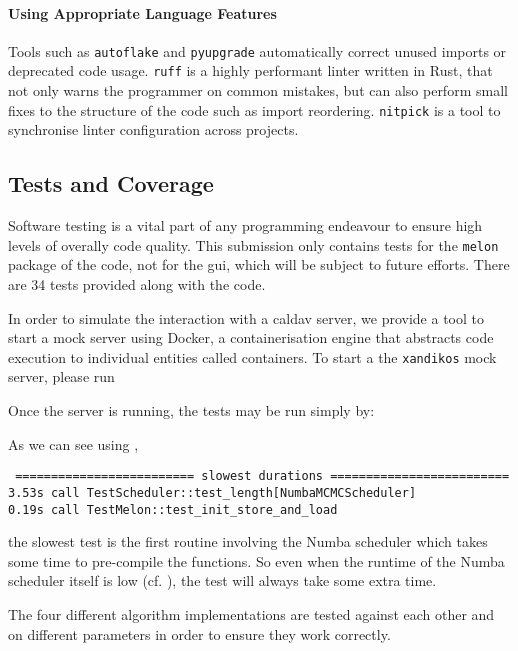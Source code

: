 \paragraph{Using Appropriate Language Features}
Tools such as \texttt{autoflake} and \texttt{pyupgrade} automatically correct unused imports or deprecated code usage.
\texttt{ruff} is a highly performant linter written in Rust, that not only warns the programmer on common mistakes, but can also perform small fixes to the structure of the code such as import reordering.
\texttt{nitpick} is a tool to synchronise linter configuration across projects.

\subsection{Tests and Coverage}
Software testing is a vital part of any programming endeavour to ensure high levels of overally code quality.
This submission only contains tests for the \texttt{melon} package of the code, not for the \gls{gui}, which will be subject to future efforts.
There are 34 tests provided along with the code.

In order to simulate the interaction with a \gls{caldav} server, we provide a tool to start a mock server using Docker, a containerisation engine that abstracts code execution to individual entities called containers.
To start a the \texttt{xandikos} mock server, please run


Once the server is running, the tests may be run simply by:


As we can see using ,

\texttt{
  ========================= slowest durations ========================= \\
  3.53s call TestScheduler::test\_length[NumbaMCMCScheduler] \\
  0.19s call TestMelon::test\_init\_store\_and\_load
}

the slowest test is the first routine involving the Numba scheduler which takes some time to pre-compile the functions.
So even when the runtime of the Numba scheduler itself is low (cf. ), the test will always take some extra time.

The four different algorithm implementations are tested against each other and on different parameters in order to ensure they work correctly.

